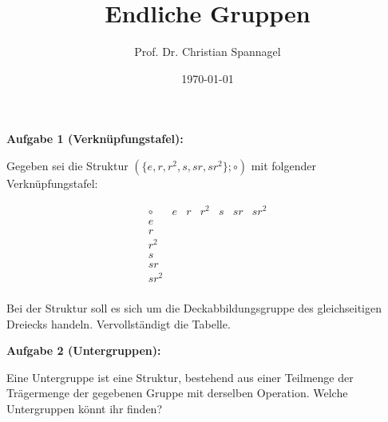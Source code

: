 \documentclass{cssheet}
\title{Endliche Gruppen}
\author{Prof. Dr. Christian Spannagel}
\date{\today}
\begin{document}
\printtitle


\textbf{Aufgabe 1 (Verknüpfungstafel):} 

Gegeben sei die Struktur  $(\{e,r,r^2,s,sr,sr^2\};\circ)$  mit folgender Verknüpfungstafel:

\[
\begin{array}{c|cccccc}
	\circ & e & r & r^2 & s & sr & sr^2 \\
	\hline
	e     &  & &  &  &  &  \\
	r     &  & &  &  &  &  \\
	r^2   &  & &  &  &  &  \\
	s     &  & &  &  &  &  \\
	sr    &  & &  &  &  &  \\
	sr^2  &  & &  &  &  &  \\
\end{array}
\]

Bei der Struktur soll es sich um die Deckabbildungsgruppe des gleichseitigen Dreiecks handeln. Vervollständigt die Tabelle.

\textbf{Aufgabe 2 (Untergruppen):} 

Eine Untergruppe ist eine Struktur, bestehend aus einer Teilmenge der Trägermenge der gegebenen Gruppe mit derselben Operation. Welche Untergruppen könnt ihr finden?



\vspace*{2cm}
\printlicense

\printsocials
\end{document}
